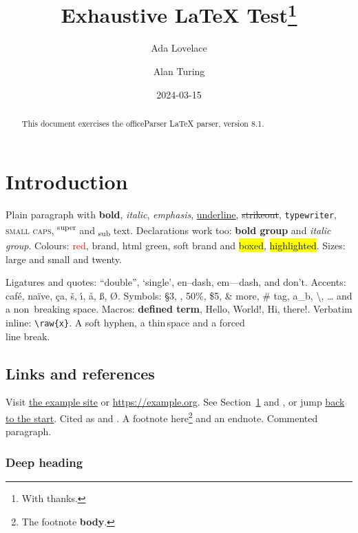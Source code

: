 \documentclass[12pt,a4paper]{article}
\title{Exhaustive \LaTeX{} Test\thanks{With thanks.}}
\author{Ada Lovelace \and Alan Turing}
\date{2024-03-15}
\newcommand{\product}{officeParser}
\newcommand{\term}[1]{\textbf{#1}}
\newcommand{\greet}[2][Hello]{#1, #2!}
\def\version{8.1}
\begin{document}
\maketitle

\begin{abstract}
This document exercises the \product{} \LaTeX{} parser, version \version.
\end{abstract}

\tableofcontents

\section{Introduction}\label{sec:intro}
Plain paragraph with \textbf{bold}, \textit{italic}, \emph{emphasis}, \underline{underline},
\sout{strikeout}, \texttt{typewriter}, \textsc{small caps}, \textsuperscript{super} and
\textsubscript{sub} text. Declarations work too: {\bfseries bold group} and {\itshape italic group}.
Colours: \textcolor{red}{red}, \textcolor{brand}{brand}, \textcolor[HTML]{00AA00}{html green},
{\color{softbrand}soft brand} and \colorbox{yellow}{boxed}, \hl{highlighted}.
Sizes: {\large large} and {\small small} and {\fontsize{20pt}{24pt}\selectfont twenty}.

Ligatures and quotes: ``double'', `single', en--dash, em---dash, and don't.
Accents: caf\'e, na\"ive, \c{c}a, \v{s}, \'{\i}, \aa, \ss, \O. Symbols: \S 3, \textcopyright, 50\%,
\$5, \& more, \# tag, a\_b, \textbackslash, \ldots{} and a non~breaking space.
Macros: \term{defined term}, \greet{World}, \greet[Hi]{there}. Verbatim inline: \verb|\raw{x}|.
A soft hy\-phen, a thin\,space and a forced\\line break.

\subsection{Links and references}\label{sec:links}
Visit \href{https://example.com/a_b?x=1\&y=2}{the example site} or \url{https://example.org}.
See Section~\ref{sec:intro} and , or jump \hyperref[sec:intro]{back to the start}.
Cited as \cite{knuth1984} and \citep[p.~5]{lamport1994,mittelbach2004}.
A footnote here\footnote{The footnote \textbf{body}.} and an endnote.
Commented paragraph.

\subsubsection{Deep heading}
\end{document}

